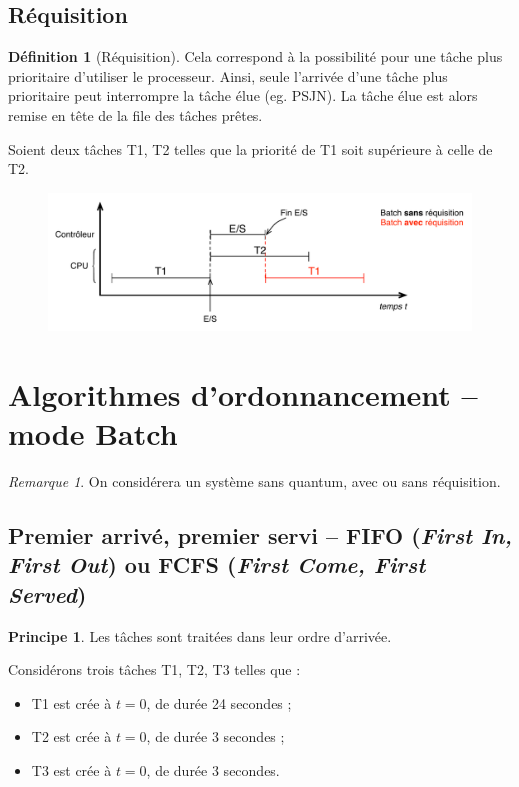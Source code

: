 \documentclass[11pt,english,french]{scrreprt}
\theoremstyle{remark}
\newtheorem*{rem*}{Remarque}
\theoremstyle{definition}
\newtheorem*{def*}{Définition}
\newtheorem*{ppe*}{Principe}
\begin{document}
\subsection{Réquisition} %
\begin{def*}[Réquisition]
	Cela correspond à la possibilité pour une tâche plus prioritaire d'utiliser le processeur. Ainsi, seule l'arrivée d'une tâche plus prioritaire peut interrompre la tâche élue (eg. PSJN). La tâche élue est alors remise en tête de la file des tâches prêtes.
\end{def*}

Soient deux tâches T1, T2 telles que la priorité de T1 soit supérieure à celle de T2.

\begin{figure}[h!]
	\center
	\includegraphics[scale=.65]{img/batch-requisition}
	\vspace{20pt}
\end{figure}

\section{Algorithmes d'ordonnancement -- mode Batch} %

\begin{rem*}
	On considérera un système sans quantum, avec ou sans réquisition.
\end{rem*}

\subsection{Premier arrivé, premier servi -- FIFO (\emph{First In, First Out}) ou FCFS (\emph{First Come, First Served})} %

\begin{ppe*}
	Les tâches sont traitées dans leur ordre d'arrivée.
\end{ppe*}

Considérons trois tâches T1, T2, T3 telles que :\begin{itemize}
	\item T1 est crée à $t=0$, de durée 24 secondes ;
	\item T2 est crée à $t=0$, de durée 3 secondes ;
	\item T3 est crée à $t=0$, de durée 3 secondes.
\end{itemize}
\end{document}
